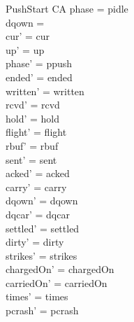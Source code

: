 \documentclass[a4paper,10pt,fleqn]{article}
\begin{document}
\begin{schema}{PushStart}
  \Delta CA
\where
  phase = pidle \\
  dqown = \emptyset \\
  cur' = cur \\
  up' = up \\
  phase' = ppush \\
  ended' = ended \\
  written' = written \\
  rcvd' = rcvd \\
  hold' = hold \\
  flight' = flight \\
  rbuf' = rbuf \\
  sent' = sent \\
  acked' = acked \\
  carry' = carry \\
  dqown' = dqown \\
  dqcar' = dqcar \\
  settled' = settled \\
  dirty' = dirty \\
  strikes' = strikes \\
  chargedOn' = chargedOn \\
  carriedOn' = carriedOn \\
  times' = times \\
  pcrash' = pcrash
\end{schema}
\end{document}
